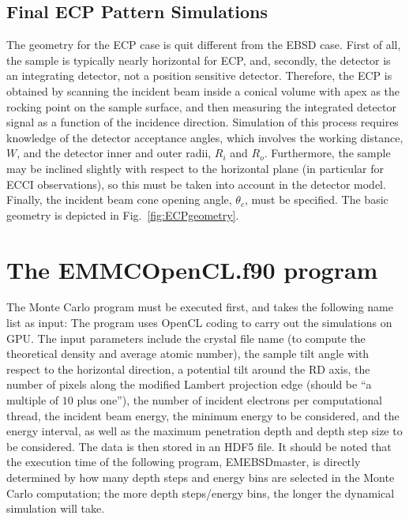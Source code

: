 \documentclass[DIV=calc, paper=letter, fontsize=11pt]{scrartcl}	 %
\begin{document}
\subsection{Final ECP Pattern Simulations \label{sec:ECP}}
The geometry for the ECP case is quit different from the EBSD case.  First of all, the sample is typically nearly horizontal for ECP,
and, secondly, the detector is an integrating detector, not a position sensitive detector.  Therefore, the ECP is obtained by scanning
the incident beam inside a conical volume with apex as the rocking point on the sample surface, and then measuring the integrated 
detector signal as a function of the incidence direction.  Simulation of this process requires knowledge of the detector acceptance 
angles, which involves the working distance, $W$, and the detector inner and outer radii, $R_i$ and $R_o$.  Furthermore, the sample may be inclined
slightly with respect to the horizontal plane (in particular for ECCI observations), so this must be taken into account in the detector model.
Finally, the incident beam cone opening angle, $\theta_c$, must be specified.  The basic geometry is depicted in Fig.~\ref{fig:ECPgeometry}.






\section{The \protect\textsf{EMMCOpenCL.f90} program\label{sec:f90MC}}
The Monte Carlo program must be executed first, and takes the following name list as input:
The program uses OpenCL coding to carry out the simulations on GPU.  The input parameters
include the crystal file name (to compute the theoretical density and average atomic number), the sample
tilt angle with respect to the horizontal direction, a potential tilt around the \textsf{RD} axis, the number of pixels
along the modified Lambert projection edge (should be ``a multiple of $10$ plus one''), the number of incident electrons per computational thread, 
the incident beam energy, the minimum energy to be considered, and the energy interval,
as well as the maximum penetration depth and depth step size to be considered.  The data is then stored in an 
HDF5 file.  It should be noted that the execution time of the 
following program, \textsf{EMEBSDmaster}, is directly determined by how many depth steps and energy bins are selected in the
Monte Carlo computation; the more depth steps/energy bins, the longer the dynamical simulation will take.
%
\end{document}
